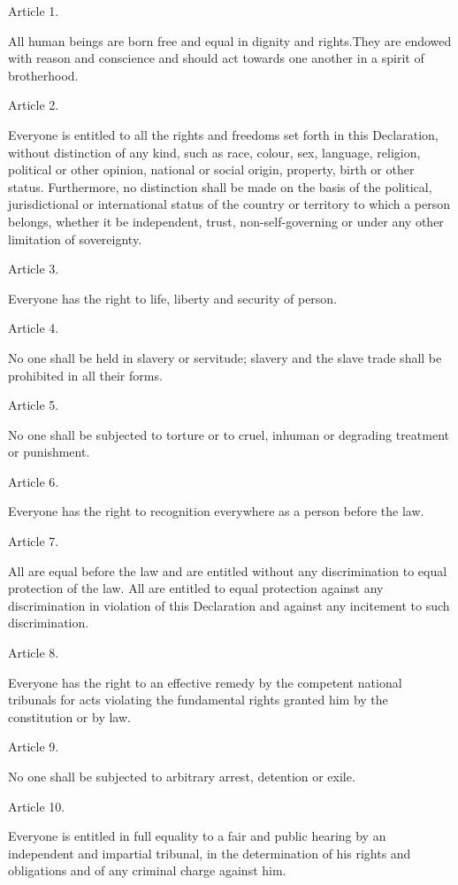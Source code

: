 \documentclass[11pt,a4paper]{article}
\begin{document}
Article 1.

All human beings are born free and equal in dignity and rights.They are endowed with reason and conscience and should act towards one another in a spirit of brotherhood.

Article 2.

Everyone is entitled to all the rights and freedoms set forth in this Declaration, without distinction of any kind, such as race, colour, sex, language, religion, political or other opinion, national or social origin, property, birth or other status. Furthermore, no distinction shall be made on the basis of the political, jurisdictional or international status of the country or territory to which a person belongs, whether it be independent, trust, non-self-governing or under any other limitation of sovereignty.

Article 3.

Everyone has the right to life, liberty and security of person.

Article 4.

No one shall be held in slavery or servitude; slavery and the slave trade shall be prohibited in all their forms.

Article 5.

No one shall be subjected to torture or to cruel, inhuman or degrading treatment or punishment.

Article 6.

Everyone has the right to recognition everywhere as a person before the law.

Article 7.

All are equal before the law and are entitled without any discrimination to equal protection of the law. All are entitled to equal protection against any discrimination in violation of this Declaration and against any incitement to such discrimination.

Article 8.

Everyone has the right to an effective remedy by the competent national tribunals for acts violating the fundamental rights granted him by the constitution or by law.

Article 9.

No one shall be subjected to arbitrary arrest, detention or exile.

Article 10.

Everyone is entitled in full equality to a fair and public hearing by an independent and impartial tribunal, in the determination of his rights and obligations and of any criminal charge against him.
\end{document}
